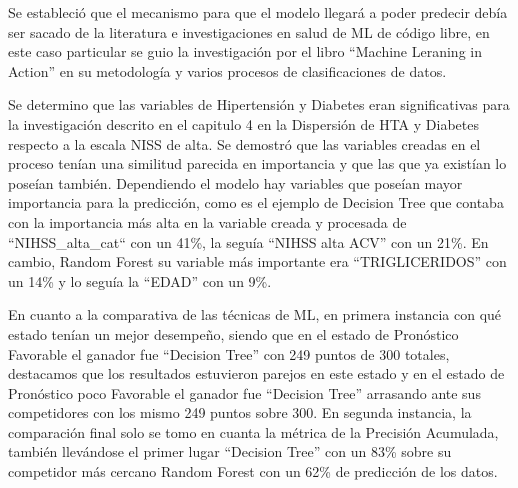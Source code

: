 \par Se estableció que el mecanismo para que el modelo llegará a poder predecir debía ser sacado de la literatura e investigaciones en salud de ML de código libre, en este caso particular se guio la investigación por el libro “Machine Leraning in Action” en su metodología y varios procesos de clasificaciones de datos. \\

\par Se determino que las variables de Hipertensión y Diabetes eran significativas para la investigación descrito en el capitulo 4 en la Dispersión de HTA y Diabetes respecto a la escala NISS de alta. Se demostró que las variables creadas en el proceso tenían una similitud parecida en importancia y que las que ya existían lo poseían también. Dependiendo el modelo hay variables que poseían mayor importancia para la predicción, como es el ejemplo de Decision Tree que contaba con la importancia más alta en la variable creada y procesada de “NIHSS\_alta\_cat“ con un 41\%, la seguía “NIHSS alta ACV” con un 21\%. En cambio, Random Forest su variable más importante era “TRIGLICERIDOS” con un 14\% y lo seguía la “EDAD” con un 9\%.\\

\par En cuanto a la comparativa de las técnicas de ML, en primera instancia con qué estado tenían un mejor desempeño, siendo que en el estado de Pronóstico Favorable el ganador fue “Decision Tree” con 249 puntos de 300 totales, destacamos que los resultados estuvieron parejos en este estado y en el estado de Pronóstico poco Favorable el ganador fue “Decision Tree” arrasando ante sus competidores con los mismo 249 puntos sobre 300.  En segunda instancia, la comparación final solo se tomo en cuanta la métrica de la Precisión Acumulada, también llevándose el primer lugar “Decision Tree” con un 83\% sobre su competidor más cercano Random Forest con un 62\% de predicción de los datos.\\

